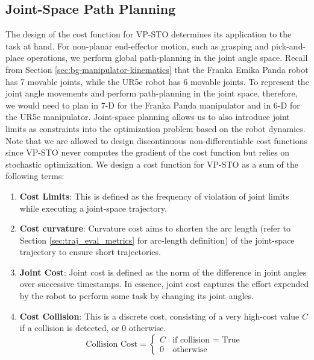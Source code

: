 \subsection{Joint-Space Path Planning}\label{sec:joint-cost}

The design of the cost function for VP-STO determines its application to the task at hand. For non-planar end-effector motion, such as grasping and pick-and-place operations, we perform global path-planning in the joint angle space. Recall from Section \ref{sec:bg-manipulator-kinematics} that the Franka Emika Panda robot has 7 movable joints, while the UR5e robot has 6 movable joints. To represent the joint angle movements and perform path-planning in the joint space, therefore, we would need to plan in 7-D for the Franka Panda manipulator and in 6-D for the UR5e manipulator. Joint-space planning allows us to also introduce joint limits as constraints into the optimization problem based on the robot dynamics. Note that we are allowed to design discontinuous non-differentiable cost functions since VP-STO never computes the gradient of the cost function but relies on stochastic optimization. We design a cost function for VP-STO as a sum of the following terms:

\begin{enumerate}
    \item \textbf{Cost Limits}: This is defined as the frequency of violation of joint limits while executing a joint-space trajectory. 
    \item \textbf{Cost curvature}: Curvature cost aims to shorten the arc length (refer to Section \ref{sec:traj_eval_metrics} for arc-length definition) of the joint-space trajectory to ensure short trajectories. 
    \item \textbf{Joint Cost}: Joint cost is defined as the norm of the difference in joint angles over successive timestamps. In essence, joint cost captures the effort expended by the robot to perform some task by changing its joint angles. 
    \item \textbf{Cost Collision}: This is a discrete cost, consisting of a very high-cost value $C$ if a collision is detected, or 0 otherwise. 
    \begin{equation}
        \text{Collision Cost} = \begin{cases} 
      C & \text{if collision = True} \\
      0 & \text{otherwise} 
   \end{cases}
    \end{equation}
    
\end{enumerate}

